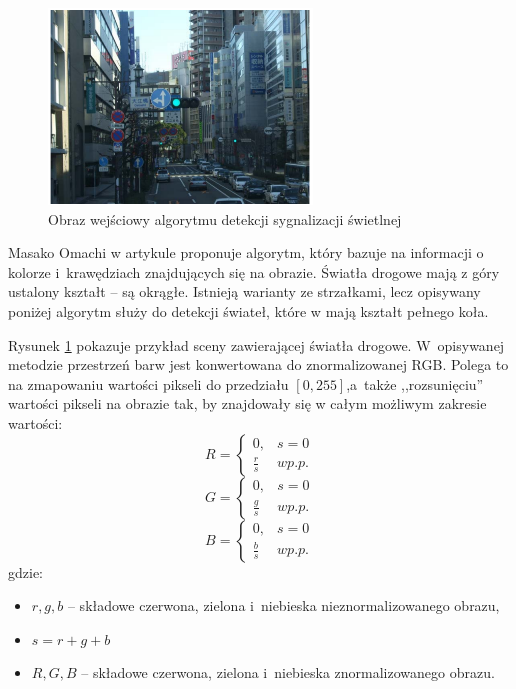 \begin{figure}
  \centering
  \includegraphics[width=7cm]{img/tl_input.png}
  \caption{Obraz wejściowy algorytmu detekcji sygnalizacji świetlnej\cite{T4}}
  \label{fig:tl_input}
\end{figure}

Masako Omachi w artykule \cite{T4} proponuje algorytm, który bazuje na informacji o kolorze i~krawędziach znajdujących się na obrazie. 
Światła drogowe mają z góry ustalony kształt -- są okrągłe. 
Istnieją warianty ze strzałkami, lecz opisywany poniżej algorytm służy do detekcji świateł, które w \cite{Kodeks} mają kształt pełnego koła.

Rysunek \ref{fig:tl_input} pokazuje przykład sceny zawierającej światła drogowe. 
W~opisywanej metodzie przestrzeń barw jest konwertowana do znormalizowanej RGB. 
Polega to na zmapowaniu wartości pikseli do przedziału $[0,255]$,a~także ,,rozsunięciu'' wartości pikseli na obrazie tak, by znajdowały się w całym możliwym zakresie wartości:
\begin{equation}
R=\left\{\begin{matrix}
0, &  s=0\\
\frac{r}{s} & w p.p.
\end{matrix}\right.
\end{equation}
\begin{equation}
G=\left\{\begin{matrix}
0, &  s=0\\
\frac{g}{s} & w p.p.
\end{matrix}\right.
\end{equation}
\begin{equation}
B=\left\{\begin{matrix}
0, &  s=0\\
\frac{b}{s} & w p.p.
\end{matrix}\right.
\end{equation}
gdzie:
\begin{itemize}
\item$r,g,b$ -- składowe czerwona, zielona i~niebieska nieznormalizowanego obrazu,
\item$s = r+g+b$
\item$R,G,B$ -- składowe czerwona, zielona i~niebieska znormalizowanego obrazu.
\end{itemize}


